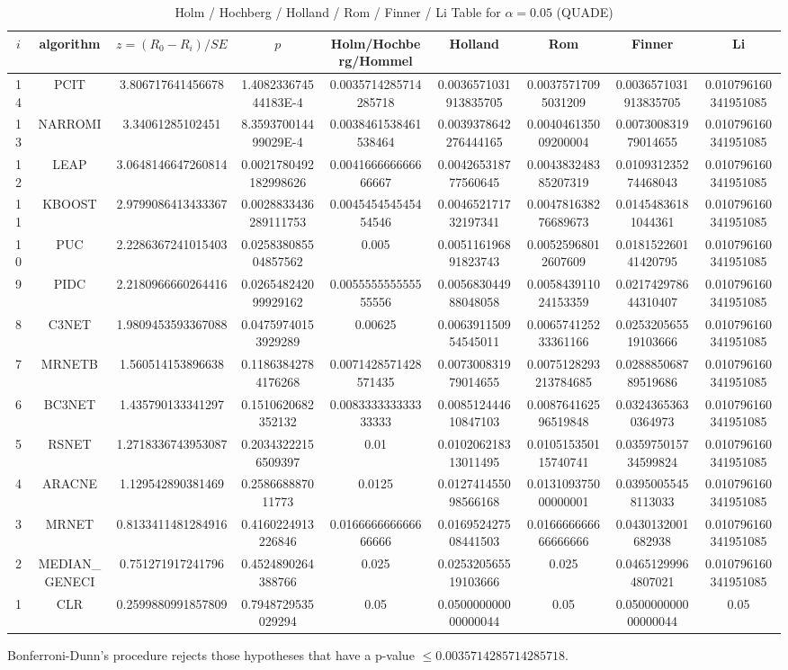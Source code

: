 \documentclass[a4paper,10pt]{article}
\begin{document}
\begin{landscape}
\begin{table}[!htp]
\centering\scriptsize
\caption{Holm / Hochberg / Holland / Rom / Finner / Li Table for $\alpha=0.05$ (QUADE)}
\begin{tabular}{ccccccccc}
$i$&algorithm&$z=(R_0 - R_i)/SE$&$p$&Holm/Hochberg/Hommel&Holland&Rom&Finner&Li\\
\hline
14&PCIT&3.806717641456678&1.408233674544183E-4&0.0035714285714285718&0.0036571031913835705&0.00375717095031209&0.0036571031913835705&0.010796160341951085\\
13&NARROMI&3.34061285102451&8.359370014499029E-4&0.0038461538461538464&0.0039378642276444165&0.004046135009200004&0.007300831979014655&0.010796160341951085\\
12&LEAP&3.0648146647260814&0.0021780492182998626&0.004166666666666667&0.004265318777560645&0.004383248385207319&0.010931235274468043&0.010796160341951085\\
11&KBOOST&2.9799086413433367&0.0028833436289111753&0.004545454545454546&0.004652171732197341&0.004781638276689673&0.01454836181044361&0.010796160341951085\\
10&PUC&2.2286367241015403&0.025838085504857562&0.005&0.005116196891823743&0.00525968012607609&0.018152260141420795&0.010796160341951085\\
9&PIDC&2.2180966660264416&0.026548242099929162&0.005555555555555556&0.005683044988048058&0.005843911024153359&0.021742978644310407&0.010796160341951085\\
8&C3NET&1.9809453593367088&0.04759740153929289&0.00625&0.006391150954545011&0.006574125233361166&0.025320565519103666&0.010796160341951085\\
7&MRNETB&1.560514153896638&0.11863842784176268&0.0071428571428571435&0.007300831979014655&0.0075128293213784685&0.028885068789519686&0.010796160341951085\\
6&BC3NET&1.435790133341297&0.1510620682352132&0.008333333333333333&0.008512444610847103&0.008764162596519848&0.03243653630364973&0.010796160341951085\\
5&RSNET&1.2718336743953087&0.20343222156509397&0.01&0.010206218313011495&0.010515350115740741&0.035975015734599824&0.010796160341951085\\
4&ARACNE&1.129542890381469&0.258668887011773&0.0125&0.012741455098566168&0.013109375000000001&0.03950055458113033&0.010796160341951085\\
3&MRNET&0.8133411481284916&0.4160224913226846&0.016666666666666666&0.016952427508441503&0.016666666666666666&0.0430132001682938&0.010796160341951085\\
2&MEDIAN_GENECI&0.751271917241796&0.4524890264388766&0.025&0.025320565519103666&0.025&0.04651299964807021&0.010796160341951085\\
1&CLR&0.2599880991857809&0.7948729535029294&0.05&0.050000000000000044&0.05&0.050000000000000044&0.05\\
\hline
\end{tabular}
\end{table}
Bonferroni-Dunn's procedure rejects those hypotheses that have a p-value $\le0.0035714285714285718$.



\end{landscape}
\end{document}
